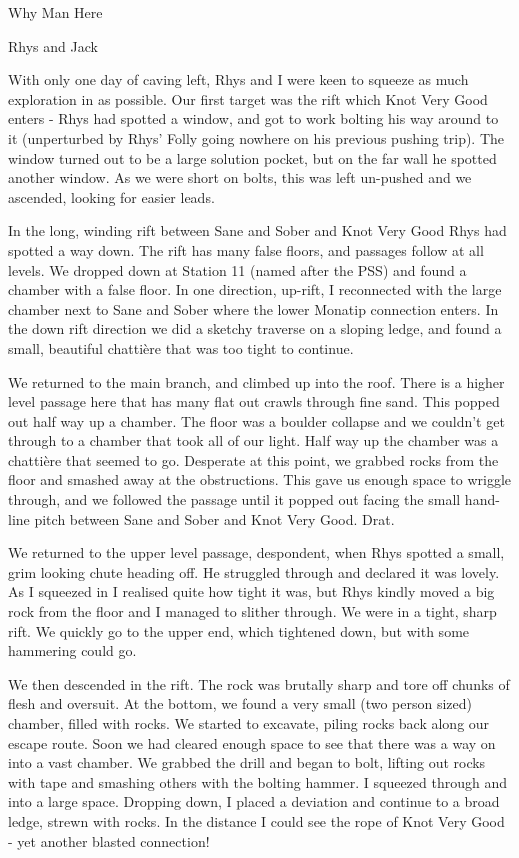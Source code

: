  
Why Man Here
 
Rhys and Jack
 
With only one day of caving left, Rhys and I were keen to squeeze as much exploration in as possible. Our first target was the rift which Knot Very Good enters - Rhys had spotted a window, and got to work bolting his way around to it (unperturbed by Rhys’ Folly going nowhere on his previous pushing trip). The window turned out to be a large solution pocket, but on the far wall he spotted another window. As we were short on bolts, this was left un-pushed and we ascended, looking for easier leads.
 
In the long, winding rift between Sane and Sober and Knot Very Good Rhys had spotted a way down. The rift has many false floors, and passages follow at all levels. We dropped down at Station 11 (named after the PSS) and found a chamber with a false floor. In one direction, up-rift, I reconnected with the large chamber next to Sane and Sober where the lower Monatip connection enters. In the down rift direction we did a sketchy traverse on a sloping ledge, and found a small, beautiful chattière that was too tight to continue.
 
We returned to the main branch, and climbed up into the roof. There is a higher level passage here that has many flat out crawls through fine sand. This popped out half way up a chamber. The floor was a boulder collapse and we couldn’t get through to a chamber that took all of our light. Half way up the chamber was a chattière that seemed to go. Desperate at this point, we grabbed rocks from the floor and smashed away at the obstructions. This gave us enough space to wriggle through, and we followed the passage until it popped out facing the small hand-line pitch between Sane and Sober and Knot Very Good. Drat.
 
We returned to the upper level passage, despondent, when Rhys spotted a small, grim looking chute heading off. He struggled through and declared it was lovely. As I squeezed in I realised quite how tight it was, but Rhys kindly moved a big rock from the floor and I managed to slither through. We were in a tight, sharp rift. We quickly go to the upper end, which tightened down, but with some hammering could go. 
 
We then descended in the rift. The rock was brutally sharp and tore off chunks of flesh and oversuit. At the bottom, we found a very small (two person sized) chamber, filled with rocks. We started to excavate, piling rocks back along our escape route. Soon we had cleared enough space to see that there was a way on into a vast chamber. We grabbed the drill and began to bolt, lifting out rocks with tape and smashing others with the bolting hammer. I squeezed through and into a large space. Dropping down, I placed a deviation and continue to a broad ledge, strewn with rocks. In the distance I could see the rope of Knot Very Good - yet another blasted connection!
 
